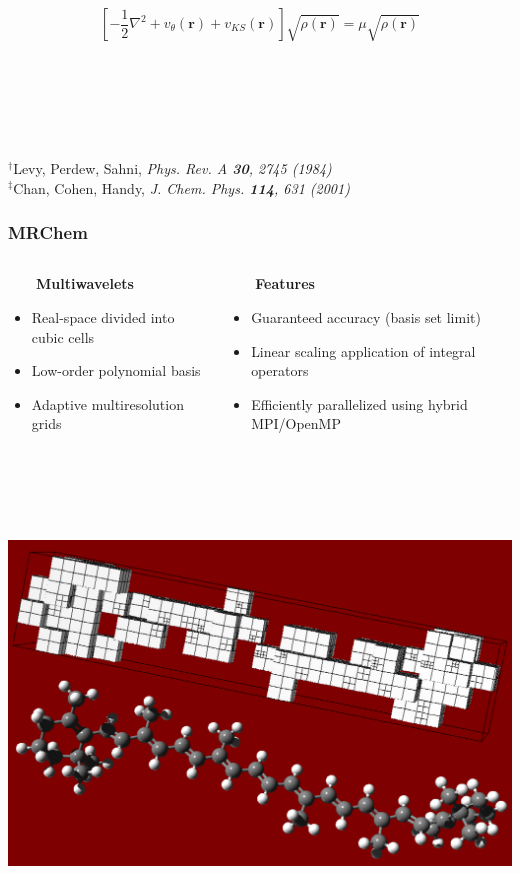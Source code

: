 \documentclass[mathserif, 8pt]{beamer}
\begin{document}
\begin{frame}
    \begin{equation}
        \nonumber
	\left[-\frac{1}{2}\nabla^2 + v_\theta(\boldsymbol{r}) + v_{KS}(\boldsymbol{r})\right]\sqrt{\rho(\boldsymbol{r})} = 
	\mu\sqrt{\rho(\boldsymbol{r})}
    \end{equation}
    \ \\
    \ \\
    \ \\
    \ \\
    \ \\
    \ \\
    $^\dag$\tiny{Levy, Perdew, Sahni, \it{Phys. Rev. A} \textbf{30}, 2745 (1984)}\\
    $^\ddag$\tiny{Chan, Cohen, Handy, \it{J. Chem. Phys.} \textbf{114}, 631 (2001)}
\end{frame}

\begin{frame}
    \frametitle{MRChem}
    \begin{columns}
    \begin{column}{.5\textwidth}
	\ \ \ \ \textbf{Multiwavelets}
	\begin{itemize}
	    \item   Real-space divided into cubic cells
	    \item   Low-order polynomial basis
	    \item   Adaptive multiresolution grids
	\end{itemize}
    \end{column}
    \begin{column}{.5\textwidth}
	\ \ \ \ \textbf{Features}
	\begin{itemize}
	    \item   Guaranteed accuracy (basis set limit)
	    \item   Linear scaling application of integral operators
	    \item   Efficiently parallelized using hybrid MPI/OpenMP
	\end{itemize}
    \end{column}
    \end{columns}
    \ \\
    \ \\
    \ \\
    \ \\
    \centering
    \includegraphics[angle=0, scale=0.2]{figures/caroteneGrid.pdf}
\end{frame}
\end{document}
